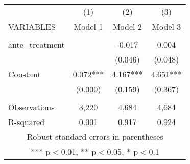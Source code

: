 \begin{tabular}{lccc} \hline
 & (1) & (2) & (3) \\
VARIABLES & Model 1 & Model 2 & Model 3 \\ \hline
 &  &  &  \\
ante\_treatment &  & -0.017 & 0.004 \\
 &  & (0.046) & (0.048) \\
Constant & 0.072*** & 4.167*** & 4.651*** \\
 & (0.000) & (0.159) & (0.367) \\
 &  &  &  \\
Observations & 3,220 & 4,684 & 4,684 \\
 R-squared & 0.001 & 0.917 & 0.924 \\ \hline
\multicolumn{4}{c}{ Robust standard errors in parentheses} \\
\multicolumn{4}{c}{ *** p$<$0.01, ** p$<$0.05, * p$<$0.1} \\
\end{tabular}
